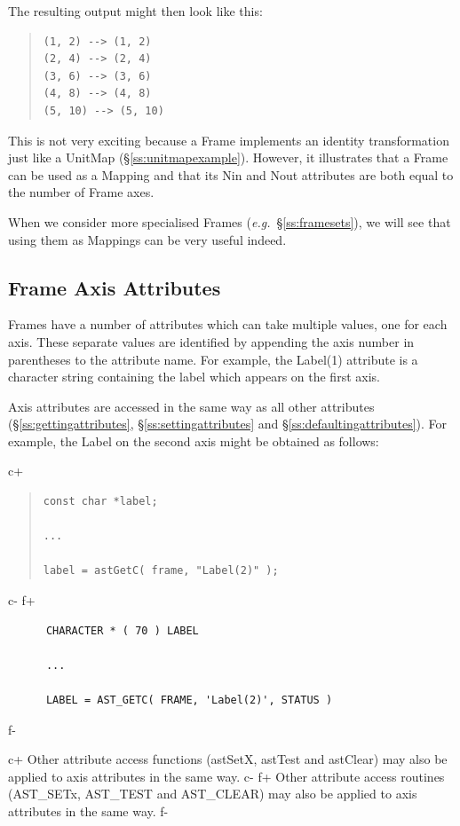 \documentclass[twoside,11pt]{article}
\newcommand{\secref}[1]{\S\ref{#1}}
\newcommand{\secref}[1]{\ref{#1}}
\begin{document}
The resulting output might then look like this:

\begin{quote}
\begin{verbatim}
(1, 2) --> (1, 2)
(2, 4) --> (2, 4)
(3, 6) --> (3, 6)
(4, 8) --> (4, 8)
(5, 10) --> (5, 10)
\end{verbatim}
\end{quote}

This is not very exciting because a Frame implements an identity
transformation just like a UnitMap
(\secref{ss:unitmapexample}). However, it illustrates that a Frame can
be used as a Mapping and that its Nin and Nout attributes are both
equal to the number of Frame axes.

When we consider more specialised Frames
({\em{e.g.}}~\secref{ss:framesets}), we will see that using them as
Mappings can be very useful indeed.

\subsection{\label{ss:frameaxisattributes}Frame Axis Attributes}

Frames have a number of attributes which can take multiple values, one
for each axis. These separate values are identified by appending the
axis number in parentheses to the attribute name. For example, the
Label(1) attribute is a character string containing the label which
appears on the first axis.

Axis attributes are accessed in the same way as all other attributes
(\secref{ss:gettingattributes}, \secref{ss:settingattributes} and
\secref{ss:defaultingattributes}). For example, the Label on the second
axis might be obtained as follows:

c+
\begin{quote}
\small
\begin{verbatim}
const char *label;

...

label = astGetC( frame, "Label(2)" );
\end{verbatim}
\normalsize
\end{quote}
c-
f+
\small
\begin{verbatim}
      CHARACTER * ( 70 ) LABEL

      ...

      LABEL = AST_GETC( FRAME, 'Label(2)', STATUS )
\end{verbatim}
\normalsize
f-

c+
Other attribute access functions (astSetX, astTest and astClear) may
also be applied to axis attributes in the same way.
c-
f+
Other attribute access routines (AST\_SETx, AST\_TEST and AST\_CLEAR)
may also be applied to axis attributes in the same way.
f-
\end{document}
